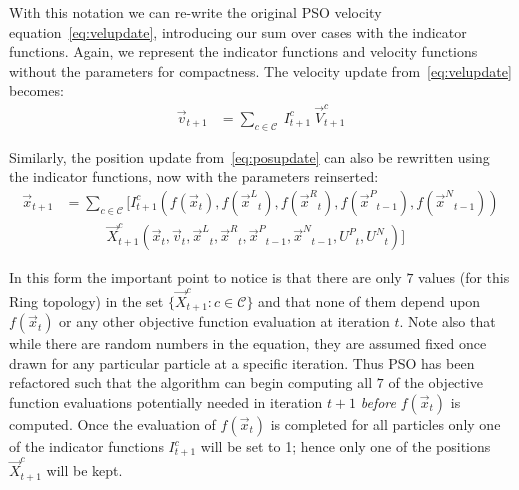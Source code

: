 \documentclass{llncs}
\newcommand{\parens}[1]{\!\left(#1\right)}
\providecommand{\pers}{\ensuremath{P}}
\providecommand{\neigh}{\ensuremath{N}}
\providecommand{\leftind}{\ensuremath{L}}
\providecommand{\rightind}{\ensuremath{R}}
\providecommand{\nURand}{\ensuremath{U^\neigh}}
\providecommand{\pURand}{\ensuremath{U^\pers}}
\providecommand{\ppos}{\ensuremath{\Vec{x}}}
\providecommand{\pvel}{\ensuremath{\Vec{v}}}
\providecommand{\nbest}{\ensuremath{\Vec{x}^\neigh}}
\providecommand{\pbest}{\ensuremath{\Vec{x}^\pers}}
\providecommand{\constriction}{\ensuremath{\chi}}
\providecommand{\ncoeff}{\ensuremath{\phi^\neigh}}
\providecommand{\pcoeff}{\ensuremath{\phi^\pers}}
\providecommand{\ofunc}{\ensuremath{f}}
\providecommand{\indic}{\ensuremath{I}}
\providecommand{\specvel}{\ensuremath{\vec{V}}}
\providecommand{\specpos}{\ensuremath{\vec{X}}}
\providecommand{\leftn}{\ensuremath{\Vec{x}^\leftind}}
\providecommand{\rightn}{\ensuremath{\Vec{x}^\rightind}}
\providecommand{\caseset}{\ensuremath{\mathcal{C}}}
\providecommand{\casegen}{\ensuremath{c}}
\begin{document}
With this notation we can re-write the original PSO velocity
equation~\eqref{eq:velupdate}, introducing our sum over cases with the
indicator functions.  Again, we represent the indicator functions and velocity
functions without the parameters for compactness.
The velocity update from~\eqref{eq:velupdate} becomes:
\begin{align}
\label{eq:vel2update}
	\pvel_{t+1} 
	&= \sum_{c \in \caseset} \ \indic_{t+1}^{c} \ \specvel_{t+1}^{c} 
\end{align}

Similarly, the position update from~\eqref{eq:posupdate}
can also be rewritten using the indicator functions, now with the parameters reinserted:
\begin{align}
\nonumber
  \ppos_{t+1} &= \sum_{c \in \caseset} \bigl[
	\indic_{t+1}^{c}\parens{
	  \ofunc\parens{\ppos_{t}},
	  \ofunc\parens{\leftn_{t}},
	  \ofunc\parens{\rightn_{t}},
	  \ofunc\parens{\pbest_{t-1}},
	  \ofunc\parens{\nbest_{t-1}}
	  } \\
\label{eq:val2updatelong}
	& \quad \quad \quad \specpos_{t+1}^{c}\parens{
	  \ppos_{t},
	  \pvel_{t},
	  \leftn_{t},
	  \rightn_{t},
	  \pbest_{t-1},
	  \nbest_{t-1},
	  \pURand_{t},
	  \nURand_{t}
	  }\bigr]
\end{align}

In this form the important point to notice is that there are only $7$ values
(for this Ring topology) in the set $\{\specpos_{t+1}^{\casegen}: \casegen \in
\caseset\}$ and that none of them depend upon $f(\ppos_t)$ or any other
objective function evaluation at iteration $t$. Note also that while there are
random numbers in the equation, they are assumed fixed once drawn for any
particular particle at a specific iteration.  Thus PSO has been refactored such
that the algorithm can begin computing all $7$ of the objective function
evaluations potentially needed in iteration $t+1$ \emph{before} $f(\ppos_t)$ is
computed.  Once the evaluation of $f(\ppos_{t})$ is completed for all particles
only one of the indicator functions $\indic_{t+1}^{\casegen}$ will be set to 1;
hence only one of the positions $\specpos_{t+1}^\casegen$ will be kept.
\end{document}
